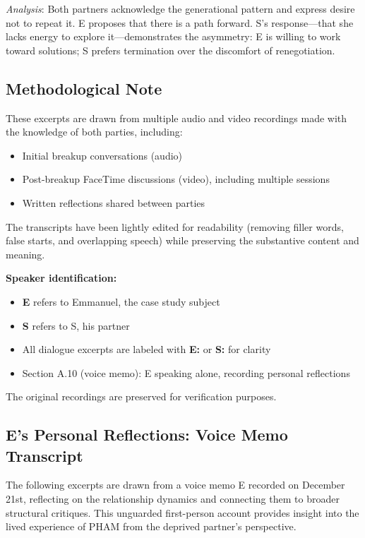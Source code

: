 \documentclass[12pt, letterpaper]{article}
\begin{document}
\textit{Analysis}: Both partners acknowledge the generational pattern and express desire not to repeat it. E proposes that there is a path forward. S's response---that she lacks energy to explore it---demonstrates the asymmetry: E is willing to work toward solutions; S prefers termination over the discomfort of renegotiation.

\subsection{Methodological Note}

These excerpts are drawn from multiple audio and video recordings made with the knowledge of both parties, including:
\begin{itemize}
    \item Initial breakup conversations (audio)
    \item Post-breakup FaceTime discussions (video), including multiple sessions
    \item Written reflections shared between parties
\end{itemize}

The transcripts have been lightly edited for readability (removing filler words, false starts, and overlapping speech) while preserving the substantive content and meaning. 

\textbf{Speaker identification:}
\begin{itemize}
    \item \textbf{E} refers to Emmanuel, the case study subject
    \item \textbf{S} refers to S, his partner
    \item All dialogue excerpts are labeled with \textbf{E:} or \textbf{S:} for clarity
    \item Section A.10 (voice memo): E speaking alone, recording personal reflections
\end{itemize}

The original recordings are preserved for verification purposes.

\subsection{E's Personal Reflections: Voice Memo Transcript}

The following excerpts are drawn from a voice memo E recorded on December 21st, reflecting on the relationship dynamics and connecting them to broader structural critiques. This unguarded first-person account provides insight into the lived experience of PHAM from the deprived partner's perspective.
\end{document}
